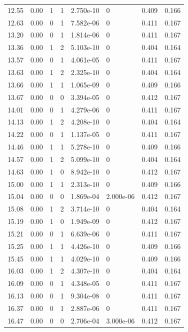 \documentclass[preview]{standalone}
\begin{document}
{{{\begin{tabular}{L{1.2cm}C{1.2cm} C{0.3cm}C{0.5cm} C{1.4cm}C{1.4cm} C{1.4cm}C{1.4cm}}
  12.55  &  0.00  & 1     &  1 &  2.750e-10  & 0  & 0.409 &  0.166   \\ 
  12.63  &  0.00  & 0     &  1 &  7.582e-06  & 0  & 0.411 &  0.167   \\ 
  13.20  &  0.00  & 0     &  1 &  1.814e-06  & 0  & 0.411 &  0.167   \\ 
  13.36  &  0.00  & 1     &  2 &  5.103e-10  & 0  & 0.404 &  0.164   \\ 
  13.57  &  0.00  & 0     &  1 &  4.061e-05  & 0  & 0.411 &  0.167   \\ 
  13.63  &  0.00  & 1     &  2 &  2.325e-10  & 0  & 0.404 &  0.164   \\ 
  13.66  &  0.00  & 1     &  1 &  1.065e-09  & 0  & 0.409 &  0.166   \\ 
  13.67  &  0.00  & 0     &  0 &  3.394e-05  & 0  & 0.412 &  0.167   \\ 
  14.01  &  0.00  & 0     &  1 &  4.279e-06  & 0  & 0.411 &  0.167   \\ 
  14.13  &  0.00  & 1     &  2 &  4.208e-10  & 0  & 0.404 &  0.164   \\ 
  14.22  &  0.00  & 0     &  1 &  1.137e-05  & 0  & 0.411 &  0.167   \\ 
  14.46  &  0.00  & 1     &  1 &  5.278e-10  & 0  & 0.409 &  0.166   \\ 
  14.57  &  0.00  & 1     &  2 &  5.099e-10  & 0  & 0.404 &  0.164   \\ 
  14.63  &  0.00  & 1     &  0 &  8.942e-10  & 0  & 0.412 &  0.167   \\ 
  15.00  &  0.00  & 1     &  1 &  2.313e-10  & 0  & 0.409 &  0.166   \\ 
  15.04  &  0.00  & 0     &  0 &  1.869e-04  & 2.000e-06  & 0.412 &  0.167   \\ 
  15.08  &  0.00  & 1     &  2 &  3.714e-10  & 0  & 0.404 &  0.164   \\ 
  15.19  &  0.00  & 1     &  0 &  1.949e-09  & 0  & 0.412 &  0.167   \\ 
  15.21  &  0.00  & 0     &  1 &  6.639e-06  & 0  & 0.411 &  0.167   \\ 
  15.25  &  0.00  & 1     &  1 &  4.426e-10  & 0  & 0.409 &  0.166   \\ 
  15.45  &  0.00  & 1     &  1 &  4.029e-10  & 0  & 0.409 &  0.166   \\ 
  16.03  &  0.00  & 1     &  2 &  4.307e-10  & 0  & 0.404 &  0.164   \\ 
  16.09  &  0.00  & 0     &  1 &  4.348e-05  & 0  & 0.411 &  0.167   \\ 
  16.13  &  0.00  & 0     &  1 &  9.304e-08  & 0  & 0.411 &  0.167   \\ 
  16.37  &  0.00  & 0     &  1 &  2.887e-06  & 0  & 0.411 &  0.167   \\ 
  16.47  &  0.00  & 0     &  0 &  2.706e-04  & 3.000e-06  & 0.412 &  0.167   \\ 
\hline 
\end{tabular} 

}}}
\end{document}
